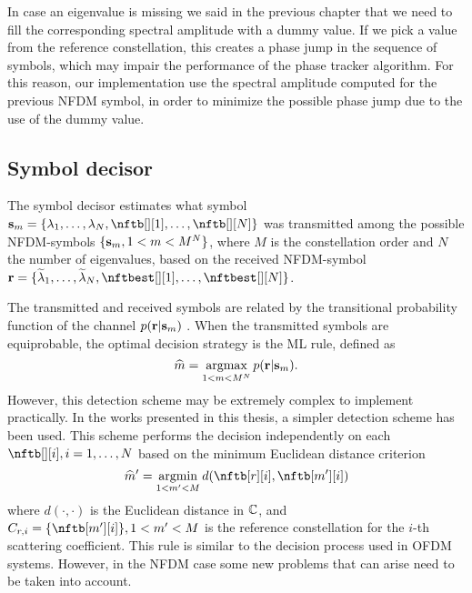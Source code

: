 \begin{extendedthesis}
In case an eigenvalue is missing we said in the previous chapter that we need to
fill the corresponding spectral amplitude with a dummy value. If we pick a value
from the reference constellation, this creates a phase jump in the sequence
of symbols, which may impair the performance of the phase tracker algorithm. For
this reason, our implementation use the spectral amplitude computed for the
previous \ac{NFDM} symbol, in order to minimize the possible phase jump due to the
use of the dummy value.
\end{extendedthesis}


\subsection{Symbol decisor}\label{sec:nfdm_symbol_decision}
The symbol decisor estimates what symbol $\matr{s}_m = \nfdmsymtx{}$ was transmitted among the possible \ac{NFDM}-symbols $\{\mathbf{s}_m, 1 < m < M^N\}$, where $M$ is the constellation order and $N$ the number of eigenvalues, based on the received \ac{NFDM}-symbol  $\matr{r} = \nfdmsymrx{}$.

The transmitted and received symbols are related by the transitional probability function of the channel $p(\mathbf{r}|\mathbf{s}_m)$ \cite{proakisdigital}. When the transmitted symbols are equiprobable, the optimal decision strategy is the \ac{ML} rule, defined as
\begin{equation}\label{eq:mindist_decision_rule}
  \widehat{m} = \operatorname*{argmax}_{1 < m < M^N} p(\mathbf{r}|\mathbf{s}_m).
\end{equation}
However, this detection scheme may be extremely complex to implement practically.
In the works presented in this thesis, a simpler detection scheme has been used. This scheme performs the decision independently on each $\nftb[][i], i = 1, \dots, N$ based on the minimum Euclidean distance criterion
\begin{equation}
  \widehat{m}' = \argmin_{1 < m' < M} d(\nftb[r][i], \nftb[m'][i])
\end{equation}
where $d(\cdot, \cdot)$ is the Euclidean distance in $\mathbb{C}$, and $C_{r,i} = \{\nftb[m'][i]\}, 1 < m' < M$ is the reference constellation for the $i$-th scattering coefficient. This rule is similar to the decision process used in \ac{OFDM} systems.
However, in the \ac{NFDM} case some new problems that can arise need to be taken into account.

